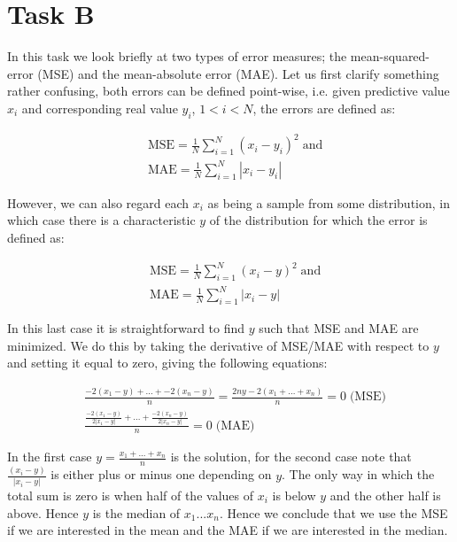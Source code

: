\documentclass[a4]{article}
\begin{document}
\section{Task B}
In this task we look briefly at two types of error measures; the mean-squared-error (MSE) and the mean-absolute error (MAE). Let us first clarify something rather confusing, both errors can be defined point-wise, i.e. given predictive value $x_i$ and corresponding real value $y_i$, $1 < i < N$, the errors are defined as:

\begin{align*}
  &\text{MSE} = \frac{1}{N} \sum^N_{i=1} (x_i - y_i)^2 \; \text{and} \\
  &\text{MAE} = \frac{1}{N} \sum^N_{i=1} |x_i - y_i|
\end{align*}

However, we can also regard each $x_i$ as being a sample from some distribution, in which case there is a characteristic $y$ of the distribution for which the error is defined as:

\begin{align*}
  &\text{MSE} = \frac{1}{N} \sum^N_{i=1} (x_i - y)^2 \; \text{and} \\
  &\text{MAE} = \frac{1}{N} \sum^N_{i=1} |x_i - y|
\end{align*}

In this last case it is straightforward to find $y$ such that MSE and MAE are minimized. We do this by taking the derivative of MSE/MAE with respect to $y$ and setting it equal to zero, giving the following equations:

\begin{align*}
  &\frac{-2(x_1 - y) + ... + -2(x_n - y)}{n} = \frac{2ny - 2(x_1 + ... + x_n)}{n} = 0 \; \text{(MSE)} \\
  &\frac{\frac{-2(x_1 - y)}{2|x_1 - y|} + ... + \frac{-2(x_n - y)}{2|x_n - y|}}{n} = 0 \; \text{(MAE)}
\end{align*}

In the first case $y = \frac{x_1 + ... + x_n}{n}$ is the solution, for the second case note that $\frac{(x_i - y)}{|x_i - y|}$ is either plus or minus one depending on $y$. The only way in which the total sum is zero is when half of the values of $x_i$ is below $y$ and the other half is above. Hence $y$ is the median of $x_1...x_n$. Hence we conclude that we use the MSE if we are interested in the mean and the MAE if we are interested in the median.
\end{document}
